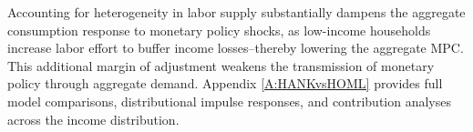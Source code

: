\documentclass[a4paper,12pt]{article}%
\begin{document}
Accounting for heterogeneity in labor supply substantially dampens the aggregate consumption response to monetary policy shocks, as low-income households increase labor effort to buffer income losses--thereby lowering the aggregate MPC. This additional margin of adjustment weakens the transmission of monetary policy through aggregate demand. Appendix \ref{A:HANKvsHOML} provides full model comparisons, distributional impulse responses, and contribution analyses across the income distribution.















\end{document}
